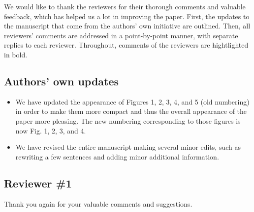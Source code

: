 \documentclass[11pt]{report}
\begin{document}
We would like to thank the reviewers for their thorough comments and valuable feedback, which has helped us a lot in improving the paper. First, the updates to the manuscript that come from the authors' own initiative are outlined. Then, all reviewers' comments are addressed in a point-by-point manner, with separate replies to each reviewer. 
Throughout, comments of the reviewers are hightlighted in bold.

\noindent \hdashrule{12.5cm}{0.2pt}{2mm 1pt}

\subsection*{Authors' own updates}

\begin{itemize}

\item We have updated the appearance of Figures 1, 2, 3, 4, and 5 (old numbering) in order to make them more compact and thus the overall appearance of the paper more pleasing. The new numbering corresponding to those figures is now Fig. 1, 2, 3, and 4.

\item We have revised the entire manuscript making several minor edits, such as rewriting a few sentences and adding minor additional information.

\end{itemize}

\noindent \hdashrule{12.5cm}{0.2pt}{2mm 1pt}

\subsection*{Reviewer \#1}

Thank you again for your valuable comments and suggestions.

\end{document}
